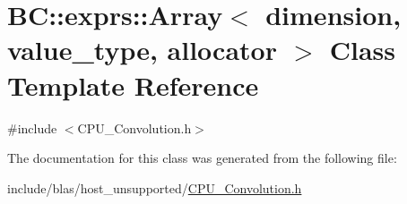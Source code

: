 \hypertarget{classBC_1_1exprs_1_1Array}{}\section{BC\+:\+:exprs\+:\+:Array$<$ dimension, value\+\_\+type, allocator $>$ Class Template Reference}
\label{classBC_1_1exprs_1_1Array}


{\ttfamily \#include $<$C\+P\+U\+\_\+\+Convolution.\+h$>$}



The documentation for this class was generated from the following file\+:\begin{DoxyCompactItemize}
\item 
include/blas/host\+\_\+unsupported/\hyperlink{CPU__Convolution_8h}{C\+P\+U\+\_\+\+Convolution.\+h}\end{DoxyCompactItemize}
